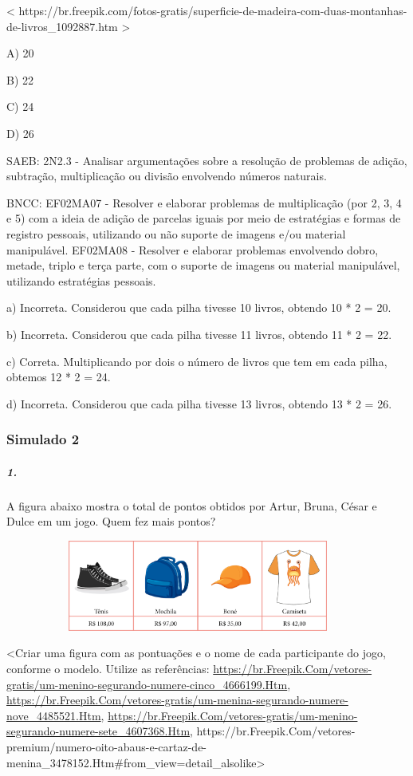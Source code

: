 \textless{}
https://br.freepik.com/fotos-gratis/superficie-de-madeira-com-duas-montanhas-de-livros\_1092887.htm
\textgreater{}

A) 20

B) 22

C) 24

D) 26

SAEB: 2N2.3 - Analisar argumentações sobre a resolução de problemas de
adição, subtração, multiplicação ou divisão envolvendo números naturais.

BNCC: EF02MA07 - Resolver e elaborar problemas de multiplicação (por 2,
3, 4 e 5) com a ideia de adição de parcelas iguais por meio de
estratégias e formas de registro pessoais, utilizando ou não suporte de
imagens e/ou material manipulável. EF02MA08 - Resolver e elaborar
problemas envolvendo dobro, metade, triplo e terça parte, com o suporte
de imagens ou material manipulável, utilizando estratégias pessoais.

a) Incorreta. Considerou que cada pilha tivesse 10 livros, obtendo 10 *
2 = 20.

b) Incorreta. Considerou que cada pilha tivesse 11 livros, obtendo 11 *
2 = 22.

c) Correta. Multiplicando por dois o número de livros que tem em cada
pilha, obtemos 12 * 2 = 24.

d) Incorreta. Considerou que cada pilha tivesse 13 livros, obtendo 13 *
2 = 26.

\subsubsection{Simulado 2}\label{simulado-2}

\subparagraph{1. }\label{section-115}

A figura abaixo mostra o total de pontos obtidos por Artur, Bruna, César
e Dulce em um jogo. Quem fez mais pontos?

\includegraphics[width=5.00000in,height=1.17708in]{media/image125.png}

\textless{}Criar uma figura com as pontuações e o nome de cada
participante do jogo, conforme o modelo. Utilize as referências:
\href{https://br.freepik.com/vetores-gratis/um-menino-segurando-numere-cinco_4666199.htm}{https://br.Freepik.Com/vetores-gratis/um-menino-segurando-numere-cinco\_4666199.Htm},
\href{https://br.freepik.com/vetores-gratis/um-menina-segurando-numere-nove_4485521.htm}{https://br.Freepik.Com/vetores-gratis/um-menina-segurando-numere-nove\_4485521.Htm},
\href{https://br.freepik.com/vetores-gratis/um-menino-segurando-numere-sete_4607368.htm}{https://br.Freepik.Com/vetores-gratis/um-menino-segurando-numere-sete\_4607368.Htm},
https://br.Freepik.Com/vetores-premium/numero-oito-abaus-e-cartaz-de-menina\_3478152.Htm\#from\_view=detail\_alsolike\textgreater{}


